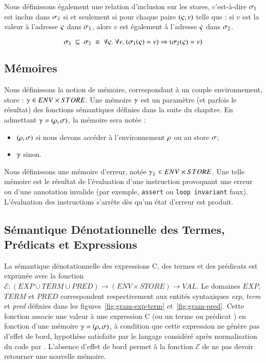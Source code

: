 Nous définissons également une relation d'inclusion sur les stores, c'est-à-dire
$\sigma_1$ est inclus dans $\sigma_2$ si et seulement si pour chaque
paire $(\varsigma, v)$ telle que : si $v$ est la valeur à l'adresse $\varsigma$
dans $\sigma_1$, alors $v$ est également à l'adresse $\varsigma$ dans $\sigma_2$.

\[
\sigma_1~\subseteq~\sigma_2~\equiv~
\forall \varsigma.~\forall v.
~(\sigma_1(\varsigma)=v) \Rightarrow (\sigma_2(\varsigma)=v)
\]


\subsection{Mémoires}
\label{sec:mem}

Nous définissons la notion de mémoire, correspondant à un couple environnement,
store : $\gamma \in ENV \times STORE$.
Une mémoire $\gamma$ est un paramètre (et parfois le résultat) des fonctions
sémantiques définies dans la suite du chapitre.
En admettant $\gamma = (\rho, \sigma)$, la mémoire sera notée :
\begin{itemize}
\item $(\rho, \sigma)$ si nous devons accéder à l'environnement $\rho$ ou au
  store $\sigma$;
\item $\gamma$ sinon.
\end{itemize}

Nous définissons une mémoire d'erreur, notée $\gamma_\lightning \in ENV \times STORE$.
Une telle mémoire est le résultat de l'évaluation d'une instruction
provoquant une erreur ou d'une annotation invalide (par exemple,
\lstinline'assert' ou \lstinline'loop invariant' faux).
L'évaluation des instructions s'arrête dès qu'un état d'erreur est produit.


\subsection{Sémantique Dénotationnelle des Termes, Prédicats et Expressions}



La sémantique dénotationnelle des expressions C, des termes et des prédicats
\eacsl est exprimée avec la fonction
$\mathcal{E} : (EXP \cup TERM \cup PRED) \rightarrow (ENV \times STORE) \rightarrow VAL$.
Le domaines $EXP$, $TERM$ et $PRED$ correspondent respectivement aux entités
syntaxiques \textit{exp}, \textit{term} et \textit{pred} définies dans les
figures~\ref{fig:gram-exp-term} et~\ref{fig:gram-pred}.
Cette fonction associe une valeur à une expression C (ou un terme ou prédicat
\eacsl) en fonction d'une mémoire $\gamma = (\rho, \sigma)$, à condition que cette
expression ne génère pas d'effet de bord, hypothèse satisfaite par le langage
considéré après normalisation du code par \framac.
L'absence d'effet de bord permet à la fonction $\mathcal{E}$ de ne pas devoir
retourner une nouvelle mémoire.

